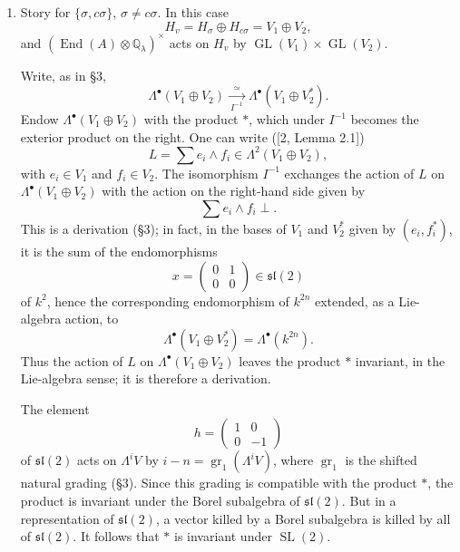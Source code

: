 \documentclass[11pt]{article}
\newcommand{\Q}{\mathbb Q}
\newcommand{\End}{\operatorname{End}}
\newcommand{\GL}{\operatorname{GL}}
\newcommand{\SL}{\operatorname{SL}}
\newcommand{\CSpin}{\operatorname{CSpin}}
\newcommand{\Lie}{\operatorname{Lie}}
\newcommand{\gr}{\operatorname{gr}}
\theoremstyle{deligne}
\begin{document}
\begin{enumerate}[label=(\alph*)]
It is immediate that, for its action on $\Lambda^\bullet V$ by left multiplication, $L$ satisfies
\[
[L,W]\subset W.
\]
Therefore $L$ is an element of $\Lie(\CSpin(W))$; it lies in the Lie algebra of the unipotent radical $N$ of the Levi subgroup defined by $W=V\oplus V^*$ (\S3), and is a non-singular element of it. The conjugates, by $\GL(V)$, of the exponential of $L$ therefore generate $N$. Similarly, $\Lambda$ and its conjugates generate the Lie algebra of the opposite unipotent subgroup. Consequently the group generated by $\GL(V)$ and $\SL(2)$ contains the Spin group; we have already seen that it contains the homotheties (\S2, (c)). Its Zariski closure, over $\Q_\ell$, is therefore $\CSpin(V\oplus V^*)$, proving Theorem 2.

\item Story for $\{\sigma,c\sigma\}$, $\sigma\ne c\sigma$. In this case
\[
H_v=H_\sigma\oplus H_{c\sigma}=V_1\oplus V_2,
\]
and $(\End(A)\otimes\Q_\lambda)^\times$ acts on $H_v$ by $\GL(V_1)\times\GL(V_2)$.

Write, as in \S3,
\[
\Lambda^\bullet(V_1\oplus V_2)\xrightarrow[\ I^{-1}\ ]{\simeq}
\Lambda^\bullet(V_1\oplus V_2^*).
\]
Endow $\Lambda^\bullet(V_1\oplus V_2)$ with the product $*$, which under $I^{-1}$ becomes the exterior product on the right. One can write ([2, Lemma 2.1])
\[
L=\sum e_i\wedge f_i\in\Lambda^2(V_1\oplus V_2),
\]
with $e_i\in V_1$ and $f_i\in V_2$. The isomorphism $I^{-1}$ exchanges the action of $L$ on $\Lambda^\bullet(V_1\oplus V_2)$ with the action on the right-hand side given by
\[
\sum e_i\wedge f_i\perp.
\]
This is a derivation (\S3); in fact, in the bases of $V_1$ and $V_2^*$ given by $(e_i,f_i^*)$, it is the sum of the endomorphisms
\[
x=\begin{pmatrix}0&1\\0&0\end{pmatrix}\in\mathfrak{sl}(2)
\]
of $k^2$, hence the corresponding endomorphism of $k^{2n}$ extended, as a Lie-algebra action, to
\[
\Lambda^\bullet(V_1\oplus V_2^*)=\Lambda^\bullet(k^{2n}).
\]
Thus the action of $L$ on $\Lambda^\bullet(V_1\oplus V_2)$ leaves the product $*$ invariant, in the Lie-algebra sense; it is therefore a derivation.

The element
\[
h=\begin{pmatrix}1&0\\0&-1\end{pmatrix}
\]
of $\mathfrak{sl}(2)$ acts on $\Lambda^iV$ by $i-n=\gr_1(\Lambda^iV)$, where $\gr_1$ is the shifted natural grading (\S3). Since this grading is compatible with the product $*$, the product is invariant under the Borel subalgebra of $\mathfrak{sl}(2)$. But in a representation of $\mathfrak{sl}(2)$, a vector killed by a Borel subalgebra is killed by all of $\mathfrak{sl}(2)$. It follows that $*$ is invariant under $\SL(2)$.


\end{enumerate}
\end{document}
